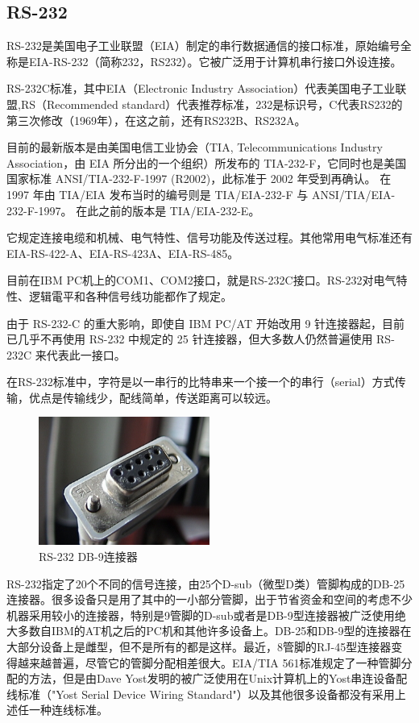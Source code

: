 \subsection{RS-232}
RS-232是美国电子工业联盟（EIA）制定的串行数据通信的接口标准，原始编号全称是EIA-RS-232（简称232，RS232）。它被广泛用于计算机串行接口外设连接。

RS-232C标准，其中EIA（Electronic Industry Association）代表美国电子工业联盟,RS（Recommended standard）代表推荐标准，232是标识号，C代表RS232的第三次修改（1969年），在这之前，还有RS232B、RS232A。

目前的最新版本是由美国电信工业协会（TIA, Telecommunications Industry Association，由 EIA 所分出的一个组织）所发布的 TIA-232-F，它同时也是美国国家标准 ANSI/TIA-232-F-1997 (R2002)，此标准于 2002 年受到再确认。 在 1997 年由 TIA/EIA 发布当时的编号则是 TIA/EIA-232-F 与 ANSI/TIA/EIA-232-F-1997。 在此之前的版本是 TIA/EIA-232-E。 

它规定连接电缆和机械、电气特性、信号功能及传送过程。其他常用电气标准还有EIA-RS-422-A、EIA-RS-423A、EIA-RS-485。

目前在IBM PC机上的COM1、COM2接口，就是RS-232C接口。RS-232对电气特性、逻辑電平和各种信号线功能都作了规定。

由于 RS-232-C 的重大影响，即使自 IBM PC/AT 开始改用 9 针连接器起，目前已几乎不再使用 RS-232 中规定的 25 针连接器，但大多数人仍然普遍使用 RS-232C 来代表此一接口。

在RS-232标准中，字符是以一串行的比特串来一个接一个的串行（serial）方式传输，优点是传输线少，配线简单，传送距离可以较远。

\begin{figure}[ht]
	\begin{center}
		\includegraphics[keepaspectratio,width=0.5\textwidth]{Hardwares/RS-232.jpeg}
	\caption{RS-232 DB-9连接器}
	\label{figRs232Db9}
	\end{center}
\end{figure}


RS-232指定了20个不同的信号连接，由25个D-sub（微型D类）管脚构成的DB-25连接器。很多设备只是用了其中的一小部分管脚，出于节省资金和空间的考虑不少机器采用较小的连接器，特别是9管脚的D-sub或者是DB-9型连接器被广泛使用绝大多数自IBM的AT机之后的PC机和其他许多设备上。DB-25和DB-9型的连接器在大部分设备上是雌型，但不是所有的都是这样。最近，8管脚的RJ-45型连接器变得越来越普遍，尽管它的管脚分配相差很大。EIA/TIA 561标准规定了一种管脚分配的方法，但是由Dave Yost发明的被广泛使用在Unix计算机上的Yost串连设备配线标准（"Yost Serial Device Wiring Standard"）以及其他很多设备都没有采用上述任一种连线标准。

